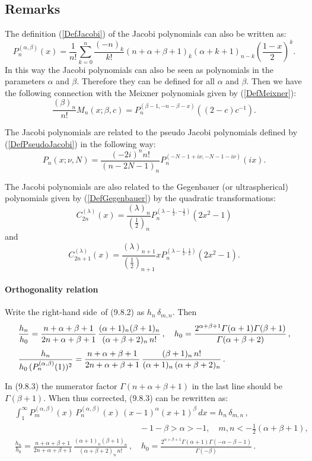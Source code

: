 \documentclass[envcountchap,graybox]{svmono}
\renewcommand{\Gamma}{\varGamma}
\newcommand\sa{\smallskipamount}
\newcommand\sLP{\\[\sa]}
\newcommand\al\alpha
\newcommand\be\beta
\newcommand\de\delta
\newcommand\Ga{\Gamma}
\newcommand\thalf{\tfrac12}
\newcommand\iy\infty
\newcommand\RHS{right-hand side}
\begin{document}
\subsection*{Remarks}
The definition (\ref{DefJacobi}) of the Jacobi polynomials can also be written as:
$$P_n^{(\alpha,\beta)}(x)=\frac{1}{n!}\sum_{k=0}^n\frac{(-n)_k}{k!}
(n+\alpha+\beta+1)_k(\alpha+k+1)_{n-k}\left(\frac{1-x}{2}\right)^k.$$
In this way the Jacobi polynomials can also be seen as polynomials in the parameters $\alpha$
and $\beta$. Therefore they can be defined for all $\alpha$ and $\beta$. Then we have the
following connection with the Meixner polynomials given by (\ref{DefMeixner}):
$$\frac{(\beta)_n}{n!}M_n(x;\beta,c)=P_n^{(\beta-1,-n-\beta-x)}((2-c)c^{-1}).$$

\noindent
The Jacobi polynomials are related to the pseudo Jacobi polynomials defined by
(\ref{DefPseudoJacobi}) in the following way:
$$P_n(x;\nu,N)=\frac{(-2i)^nn!}{(n-2N-1)_n}P_n^{(-N-1+i\nu,-N-1-i\nu)}(ix).$$

\noindent
The Jacobi polynomials are also related to the Gegenbauer (or ultraspherical) polynomials
given by (\ref{DefGegenbauer}) by the quadratic transformations:
$$C_{2n}^{(\lambda)}(x)=\frac{(\lambda)_n}{(\frac{1}{2})_n}
P_n^{(\lambda-\frac{1}{2},-\frac{1}{2})}(2x^2-1)$$
and
$$C_{2n+1}^{(\lambda)}(x)=\frac{(\lambda)_{n+1}}{(\frac{1}{2})_{n+1}}
xP_n^{(\lambda-\frac{1}{2},\frac{1}{2})}(2x^2-1).$$
\label{sec9.8}
%
\paragraph{Orthogonality relation}
Write the \RHS\ of (9.8.2) as $h_n\,\de_{m,n}$. Then
\begin{equation}
\begin{split}
&\frac{h_n}{h_0}=
\frac{n+\al+\be+1}{2n+\al+\be+1}\,
\frac{(\al+1)_n(\be+1)_n}{(\al+\be+2)_n\,n!}\,,\quad
h_0=\frac{2^{\al+\be+1}\Ga(\al+1)\Ga(\be+1)}{\Ga(\al+\be+2)}\,,\sLP
&\frac{h_n}{h_0\,(P_n^{(\al,\be)}(1))^2}=
\frac{n+\al+\be+1}{2n+\al+\be+1}\,
\frac{(\be+1)_n\,n!}{(\al+1)_n\,(\al+\be+2)_n}\,.
\end{split}
\label{60}
\end{equation}

In (9.8.3) the numerator factor $\Ga(n+\al+\be+1)$ in the last line should be
$\Ga(\be+1)$. When thus corrected, (9.8.3) can be rewritten as:
\begin{equation}
\begin{split}
&\int_1^\iy P_m^{(\al,\be)}(x)\,P_n^{(\al,\be)}(x)\,(x-1)^\al (x+1)^\be\,dx=h_n\,\de_{m,n}\,,\\
&\qquad\qquad\qquad\qquad\qquad\qquad\qquad\quad-1-\be>\al>-1,\quad m,n<-\thalf(\al+\be+1),\\
&\frac{h_n}{h_0}=
\frac{n+\al+\be+1}{2n+\al+\be+1}\,
\frac{(\al+1)_n(\be+1)_n}{(\al+\be+2)_n\,n!}\,,\quad
h_0=\frac{2^{\al+\be+1}\Ga(\al+1)\Ga(-\al-\be-1)}{\Ga(-\be)}\,.
\end{split}
\label{122}
\end{equation}
\end{document}
